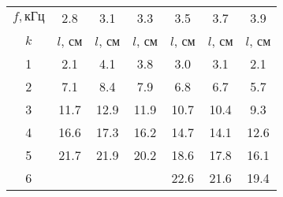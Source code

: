 \begin{tabular}{ccccccc}
\toprule
$f, \text{кГц}$ & 2.8 & 3.1 & 3.3 & 3.5 & 3.7 & 3.9 \\
$k$ & $l$, см & $l$, см & $l$, см & $l$, см & $l$, см & $l$, см \\
\midrule
1 & 2.1  & 4.1  & 3.8  & 3.0  &	3.1  & 2.1  \\
2 & 7.1  & 8.4  & 7.9  & 6.8  &	6.7  & 5.7  \\
3 & 11.7 & 12.9 & 11.9 & 10.7 &	10.4 & 9.3  \\
4 & 16.6 & 17.3 & 16.2 & 14.7 &	14.1 & 12.6 \\
5 & 21.7 & 21.9 & 20.2 & 18.6 &	17.8 & 16.1 \\
6 & 	 &		&	   & 22.6 & 21.6 & 19.4 \\
\bottomrule
\end{tabular}